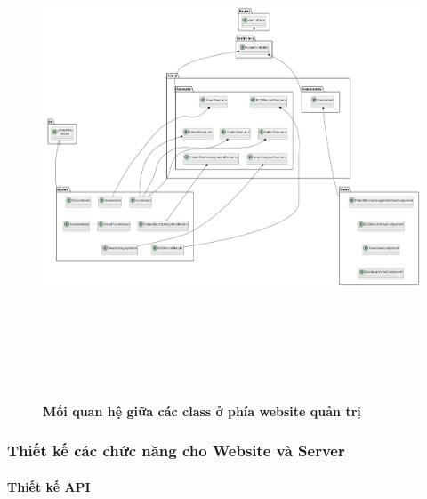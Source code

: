 \begin{enumerate}[a)]
\begin{figure}[H]
  \centering
  \includegraphics[width=16cm,height=15cm]{Images/server/class/class_admin_relation.png}
  \caption[Mối quan hệ giữa các class ở phía website quản trị]{\bfseries \fontsize{12pt}{0pt}\selectfont Mối quan hệ giữa các class ở phía website quản trị}
  \label{class_admin_relation} %
\end{figure}

\end{enumerate}



\subsubsection{Thiết kế các chức năng cho Website và Server}

\paragraph{Thiết kế API}
\mbox{}

